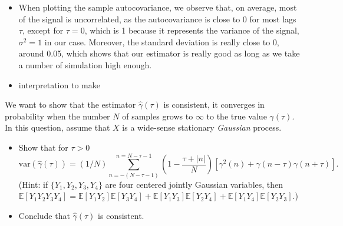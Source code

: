 \documentclass[11pt]{article}
\begin{document}
\begin{exercise}
\end{exercise}

\begin{solution}
    \begin{itemize}
        \item When plotting the sample autocovariance, we observe that, on average, most of the signal is uncorrelated, as the autocovariance is close to 0 for most lags $\tau$, except for $\tau=0$, which is 1 because it represents the variance of the signal, $\sigma^2=1$ in our case. Moreover, the standard deviation is really close to 0, around 0.05, which shows that our estimator is really good as long as we take a number of simulation high enough.
        \item interpretation to make 
    \end{itemize}
\end{solution}

\begin{exercise}
    We want to show that the estimator $\hat{\gamma}(\tau)$ is consistent, \ie it converges in probability when the number $N$ of samples grows to $\infty$ to the true value ${\gamma}(\tau)$.
    In this question, assume that $X$ is a wide-sense stationary \textit{Gaussian} process.
    \begin{itemize}
        \item Show that for $\tau>0$ 
    \begin{equation}
       \text{var}(\hat{\gamma}(\tau)) = (1/N) \sum_{n=-(N-\tau-1)}^{n=N-\tau-1} \left(1 - \frac{\tau + |n|}{N}\right) \left[\gamma^2(n) + \gamma(n-\tau)\gamma(n+\tau)\right].
    \end{equation}
    (Hint: if $\{Y_1, Y_2, Y_3, Y_4\}$ are four centered jointly Gaussian variables, then $\mathbb{E}[Y_1 Y_2 Y_3 Y_4] = \mathbb{E}[Y_1 Y_2]\mathbb{E}[Y_3 Y_4] + \mathbb{E}[Y_1 Y_3]\mathbb{E}[Y_2 Y_4] + \mathbb{E}[Y_1 Y_4]\mathbb{E}[Y_2 Y_3]$.) 
    \item Conclude that $\hat{\gamma}(\tau)$ is consistent.
    \end{itemize}
\end{exercise}
\end{document}
